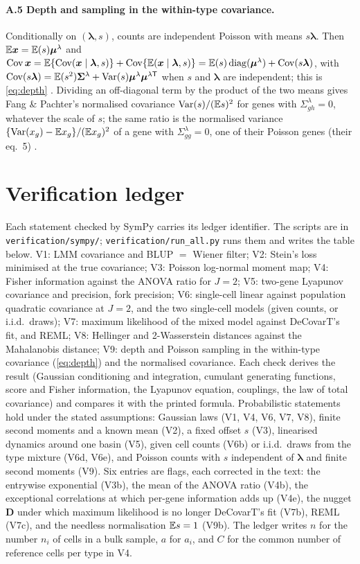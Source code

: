 \documentclass[11pt,a4paper]{article}
\begin{document}
\paragraph{A.5 Depth and sampling in the within-type covariance.}\label{app:depth} Conditionally on
$(\bm\lambda,s)$, counts are independent Poisson with means $s\bm\lambda$. Then $\mathbb{E}\bm x=\mathbb{E}(s)\bm{\mu}^\lambda$
and $\operatorname{Cov}\bm x=\mathbb{E}\{\operatorname{Cov}(\bm x\mid\bm\lambda,s)\}+\operatorname{Cov}\{\mathbb{E}(\bm x\mid\bm\lambda,s)\}=\mathbb{E}(s)\operatorname{diag}(\bm{\mu}^\lambda)+
\operatorname{Cov}(s\bm\lambda)$, with $\operatorname{Cov}(s\bm\lambda)=\mathbb{E}(s^2)\bm{\Sigma}^\lambda+\operatorname{Var}(s)\bm{\mu}^\lambda\bm{\mu}^{\lambda\mathsf T}$
when $s$ and $\bm\lambda$ are independent; this is \cref{eq:depth} . Dividing an off-diagonal
term by the product of the two means gives Fang \& Pachter's normalised covariance $\operatorname{Var}(s)/(\mathbb{E} s)^2$
for genes with $\Sigma^\lambda_{gh}=0$, whatever the scale of $s$; the same ratio is the normalised
variance $\{\operatorname{Var}(x_g)-\mathbb{E} x_g\}/(\mathbb{E} x_g)^2$ of a gene with $\Sigma^\lambda_{gg}=0$, one of their Poisson
genes (their eq.~5) .

\clearpage
\section{Verification ledger}\label{app:ledger}

Each statement checked by SymPy carries its ledger identifier. The scripts are in
\texttt{verification/sympy/}; \texttt{verification/run\_all.py} runs them and writes the table below. V1: LMM
covariance and BLUP $=$ Wiener filter; V2: Stein's loss minimised at the true covariance; V3: Poisson
log-normal moment map; V4: Fisher information against the ANOVA ratio for $J=2$; V5: two-gene Lyapunov
covariance and precision, fork precision; V6: single-cell linear against population quadratic covariance
at $J=2$, and the two single-cell models (given counts, or i.i.d.\ draws); V7: maximum likelihood of the
mixed model against DeCovarT's fit, and REML; V8: Hellinger and 2-Wasserstein distances against the
Mahalanobis distance; V9: depth and Poisson sampling in the within-type covariance (\cref{eq:depth}) and
the normalised covariance. Each check derives the result (Gaussian conditioning and integration, cumulant
generating functions, score and Fisher information, the Lyapunov equation, couplings, the law of total
covariance) and compares it with the printed formula. Probabilistic statements hold under the stated
assumptions: Gaussian laws (V1, V4, V6, V7, V8), finite second moments and a known mean (V2), a fixed
offset $s$ (V3), linearised dynamics around one basin (V5), given cell counts (V6b) or i.i.d.\ draws from
the type mixture (V6d, V6e), and Poisson counts with $s$ independent of $\bm\lambda$ and finite second
moments (V9). Six entries are flags, each corrected in the text: the entrywise exponential (V3b), the mean
of the ANOVA ratio (V4b), the exceptional correlations at which per-gene information adds up (V4e), the
nugget $\bm D$ under which maximum likelihood is no longer DeCovarT's fit (V7b), REML (V7c), and the
needless normalisation $\mathbb{E} s=1$ (V9b). The ledger writes $n$ for the number $n_i$ of cells in a bulk
sample, $a$ for $a_i$, and $C$ for the common number of reference cells per type in V4.
\end{document}
